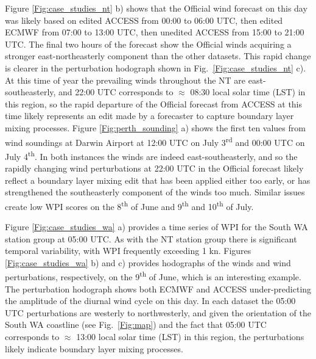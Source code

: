 \documentclass{ametsoc}
\begin{document}
Figure \ref{Fig:case_studies_nt} b) shows that the Official wind forecast on this day was likely based on edited ACCESS from 00:00 to 06:00 UTC, then edited ECMWF from 07:00 to 13:00 UTC, then unedited ACCESS from 15:00 to 21:00 UTC. The final two hours of the forecast show the Official winds acquiring a stronger east-northeasterly component than the other datasets. This rapid change is clearer in the perturbation hodograph shown in Fig.~\ref{Fig:case_studies_nt} c). At this time of year the prevailing winds throughout the NT are east-southeasterly, and 22:00 UTC corresponds to $\approx$ 08:30 local solar time (LST) in this region, so the rapid departure of the Official forecast from ACCESS at this time likely represents an edit made by a forecaster to capture boundary layer mixing processes. Figure \ref{Fig:perth_sounding} a) shows the first ten values from wind soundings at Darwin Airport at 12:00 UTC on July 3\textsuperscript{rd} and 00:00 UTC on July 4\textsuperscript{th}. In both instances the winds are indeed east-southeasterly, and so the rapidly changing wind perturbations at 22:00 UTC in the Official forecast likely reflect a boundary layer mixing edit that has been applied either too early, or has strengthened the southeasterly component of the winds too much. Similar issues create low WPI scores on the 8\textsuperscript{th} of June and 9\textsuperscript{th} and 10\textsuperscript{th} of July.

Figure \ref{Fig:case_studies_wa} a) provides a time series of WPI for the South WA station group at 05:00 UTC. As with the NT station group there is significant temporal variability, with WPI frequently exceeding 1 kn. Figures \ref{Fig:case_studies_wa} b) and c) provides hodographs of the winds and wind perturbations, respectively, on the 9\textsuperscript{th} of June, which is an interesting example. The perturbation hodograph shows both ECMWF and ACCESS under-predicting the amplitude of the diurnal wind cycle on this day. In each dataset the 05:00 UTC perturbations are westerly to northwesterly, and given the orientation of the South WA coastline (see Fig.~\ref{Fig:map}) and the fact that 05:00 UTC corresponds to $\approx$ 13:00 local solar time (LST) in this region, the perturbations likely indicate boundary layer mixing processes. 
\end{document}
